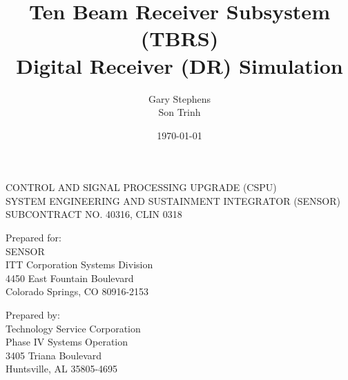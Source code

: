 \documentclass[12pt,english]{article}
\begin{document}
\newpage{}

\title{Ten Beam Receiver Subsystem (TBRS)\\
Digital Receiver (DR) Simulation}

\author{Gary Stephens\\ Son Trinh}

\date{
\today
}

\maketitle

\noindent \begin{center}
CONTROL AND SIGNAL PROCESSING UPGRADE (CSPU)\\
SYSTEM ENGINEERING AND SUSTAINMENT INTEGRATOR (SENSOR)\\
SUBCONTRACT NO. 40316, CLIN 0318
\par\end{center}


\noindent \begin{center}
Prepared for:\\
\medskip{}
SENSOR\\
ITT Corporation Systems Division\\
4450 East Fountain Boulevard\\
Colorado Springs, CO 80916-2153
\par\end{center}

\noindent \begin{center}
Prepared by:\\
\medskip{}
Technology Service Corporation\\
Phase IV Systems Operation\\
3405 Triana Boulevard\\
Huntsville, AL 35805-4695
\par\end{center}

\thispagestyle{empty}\newpage{}



\tableofcontents{}

\listoffigures

\listoftables

\newpage{}
\end{document}
